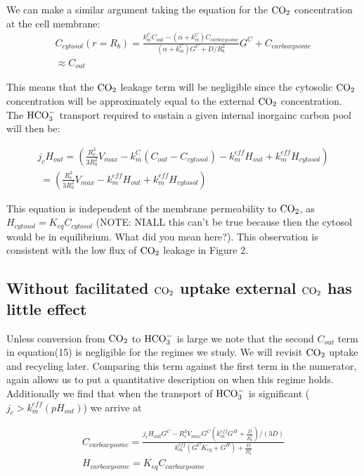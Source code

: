 \documentclass[]{article}
\begin{document}
We can make a similar argument taking the equation for the ${\rm CO_2}$ concentration at the cell membrane:
\begin{multline}
C_{cytosol}(r = R_b) = \frac{k_m^C C_{out} - (\alpha + k_m^C)C_{carboxysome}}{(\alpha+k_m^C)G^C + D/R_b^2}G^C + C_{carboxysome}\\
\approx C_{out}
\end{multline}

This means that the ${\rm CO_2}$ leakage term will be negligible since the cytosolic ${\rm CO_2}$ concentration will be approximately equal to the external ${\rm CO_2}$ concentration. The ${\rm HCO_3^-}$ transport required to sustain a given internal inorgainc carbon pool will then be:

\begin{multline}
j_c H_{out} =  \left(\frac{R_c^3}{3 R_b^2}  V_{max}  -k_m^C \left( C_{out} - C_{cytosol} \right) - k_m^{eff} H_{out} + k_m^{eff} H_{cytosol} \right) \\ 
\; = \left(\frac{R_c^3}{3 R_b^2}  V_{max}  - k_m^{eff} H_{out} + k_m^{eff} H_{cytosol} \right)
\end{multline}

This equation is independent of the membrane permeability to ${\rm CO_2}$, as $H_{cytosol} = K_{eq}C_{cytosol}$ (NOTE: NIALL this can't be true because then the cytosol would be in equilibrium. What did you mean here?). This observation is consistent with the low flux of ${\rm CO_2}$ leakage in Figure 2.

\subsection{Without facilitated ${\rm CO_2}$ uptake external ${\rm CO_2}$ has little effect}

Unless conversion from ${\rm CO_2}$ to ${\rm HCO_3^-}$ is large we note that the second $C_{out}$ term in equation(15) is negligible for the regimes we study. We will revisit ${\rm CO_2}$ uptake and recycling later. Comparing this term against the first term in the numerator, again allows us to put a quantitative description on when this regime holds. Additionally we find that when the transport of ${\rm HCO_3^-}$ is significant ($j_c > k_m^{eff}(pH_{out})$) we arrive at

\begin{eqnarray}
	C_{carboxysome} = \frac{j_c H_{out}G^C - R_c^3 V_{max}G^C(k_m^{eff} G^H + \frac{D}{R_b^2})/(3D)}
	{k_m^{eff}(G^C K_{eq} +  G^H) + \frac{D}{R_b^2} }\\
	H_{carboxysome} = K_{eq} C_{carboxysome}
\end{eqnarray}
\end{document}
